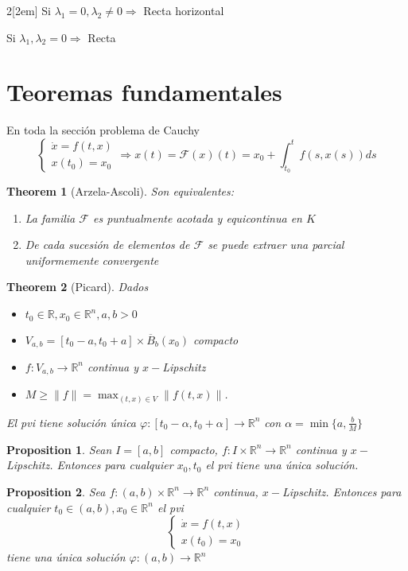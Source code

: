 \documentclass[leqno]{article}
\newtheorem*{theorem}{Theorem}
\newtheorem*{proposition}{Proposition}
\begin{document}
\begin{multicols}{2}[\columnsep2em]
Si $\lambda_1 = 0, \lambda_2 \neq 0 \Rightarrow$ Recta horizontal
	
Si $\lambda_1, \lambda_2 = 0\Rightarrow $ Recta 

\section{Teoremas fundamentales}
En toda la sección problema de Cauchy
\[
\begin{cases}
  \dot{x}=f(t, x)\\
  x(t_0) = x_0
\end{cases} \Rightarrow
x(t) = \mathcal{F}(x)(t)= x_0 + \int_{t_0}^t f(s, x(s))ds
\] 

\begin{theorem}[Arzela-Ascoli] Son equivalentes:
\begin{enumerate}[topsep=-6pt, itemsep=0pt]
  \item La familia $\mathcal{F}$ es puntualmente acotada y equicontinua en $K$
  \item De cada sucesión de elementos de $\mathcal{F}$ se puede extraer una parcial uniformemente convergente
\end{enumerate}
\end{theorem}

\begin{theorem}[Picard] Dados 
\begin{itemize}[topsep=-6pt, itemsep=0pt]
  \item $t_0\in \mathbb{R}, x_0 \in \mathbb{R}^n, a, b>0$
  \item $V_{a, b}=[t_0-a, t_0+a]\times \overline{B}_b(x_0)$ compacto
  \item $f:V_{a, b} \to  \mathbb{R}^n$ continua y $x-$Lipschitz
  \item $M\ge \|f\|=\max_{(t,x)\in V}\|f(t,x)\|$.
\end{itemize}
El pvi tiene solución única $\varphi : [t_0-\alpha , t_0+\alpha ] \to  \mathbb{R}^n$ con $\alpha = \min\{a, \frac{b}{M}\}$
\end{theorem}

\begin{proposition}
Sean  $I = [a,b]$ compacto, $f: I\times \mathbb{R}^n \to \mathbb{R}^n$ continua y $x-$Lipschitz. Entonces para cualquier $x_0, t_0$ el pvi tiene una única solución.
\end{proposition}

\begin{proposition}
Sea $f:(a,b)\times \mathbb{R}^n\to \mathbb{R}^n$ continua, $x-$Lipschitz. Entonces para cualquier  $t_0\in (a,b), x_0\in \mathbb{R}^n$ el pvi
\[
  \begin{cases}
\dot{x}=f(t,x)\\
x(t_0)=x_0
  \end{cases}
\] 
tiene una única solución $\varphi :(a,b)\to \mathbb{R}^n$
\end{proposition}


\end{multicols}
\end{document}
